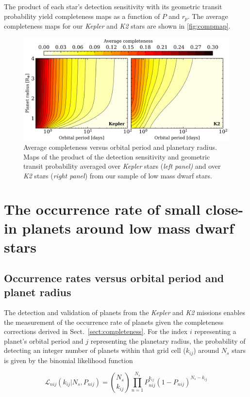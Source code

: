 \documentclass[twocolumn]{emulateapj}
\newcommand{\kepler}[1]{\emph{Kepler}#1}
\newcommand{\ktwo}[1]{\emph{K2}#1}
\begin{document}
The product of each star's detection sensitivity with its geometric transit probability yield completeness
maps as a function of $P$ and $r_p$. The average completeness maps for our \kepler{} and \ktwo{} stars are
shown in \autoref{fig:compmap}.

\begin{figure}
  \centering
  \includegraphics[width=0.98\hsize]{figures/compmap.png}
  \caption{Average completeness versus orbital period and planetary radius.
    Maps of the product of the detection sensitivity and geometric transit probability averaged over \kepler{} stars
    (\emph{left panel)} and over \ktwo{} stars (\emph{right panel}) from our sample of low mass dwarf stars.} 
  \label{fig:compmap}
\end{figure}


\section{The occurrence rate of small close-in planets around low mass dwarf stars} \label{sect:occurrence}
\subsection{Occurrence rates versus orbital period and planet radius} \label{sect:fmap}
The detection and validation of planets from the \kepler{} and \ktwo{} missions enables the measurement of the
occurrence rate of planets given the completeness corrections derived in Sect.~\ref{sect:completeness}.
For the index $i$ representing a planet's orbital period and $j$ representing the planetary
radius, the probability of detecting an integer number of planets within that grid cell ($k_{ij}$) around
$N_s$ stars is given by the binomial likelihood function

\begin{equation}
  \mathcal{L}_{nij}(k_{ij}|N_s,P_{nij}) = \binom{N_s}{k_{ij}} \prod_{n=1}^{N_s} P_{nij}^{k_{ij}} (1-P_{nij})^{N_s-k_{ij}}
  \label{eq:lnL}
\end{equation}
\end{document}
